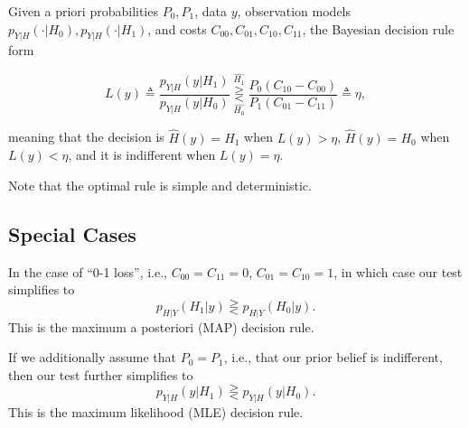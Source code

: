 \begin{theorem}

Given a priori probabilities $P_0,P_1$, data $y$, observation models $p_{Y|H}(\cdot|H_0), p_{Y|H}(\cdot|H_1)$, and costs $C_{00}, C_{01}, C_{10}, C_{11}$, the Bayesian decision rule form 

\[L(y) \triangleq \frac{p_{Y|H}(y|H_1)}{p_{Y|H}(y|H_0)} \underset{\hat{H_0}}{\overset{\hat{H_1}}{\gtreqless}} \frac{P_0(C_{10}-C_{00})}{P_1(C_{01}-C_{11})} \triangleq \eta,\] 

meaning that the decision is $\hat{H}(y) = H_1$ when $L(y) > \eta$, $\hat{H}(y) = H_0$ when $L(y) < \eta$, and it is indifferent when $L(y)=\eta$. 
\end{theorem}

Note that the optimal rule is simple and deterministic.

\subsection{Special Cases}

In the case of ``0-1 loss'', i.e., $C_{00} = C_{11} = 0$, $C_{01} = C_{10} = 1$, in which case our test simplifies to 
\[p_{H|Y}(H_1|y) \gtreqless p_{H|Y}(H_0|y).\]
This is the \ac{maximum a posteriori} (MAP) decision rule. 

If we additionally assume that $P_0=P_1$, i.e., that our prior belief is indifferent, then our test further simplifies to 
\[p_{Y|H}(y|H_1) \gtreqless p_{Y|H}(y|H_0).\] 
This is the \ac{maximum likelihood} (MLE) decision rule. 
